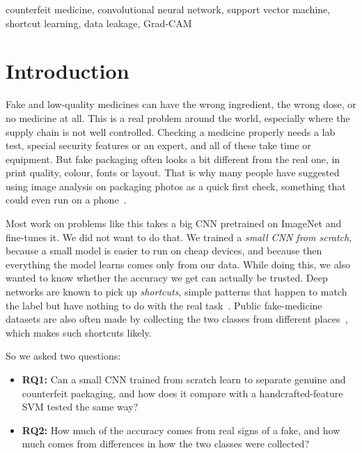 \documentclass[conference]{IEEEtran}
\begin{document}
\begin{IEEEkeywords}
counterfeit medicine, convolutional neural network, support vector machine, shortcut learning, data leakage, Grad-CAM
\end{IEEEkeywords}

\section{Introduction}
Fake and low-quality medicines can have the wrong ingredient, the wrong dose, or no medicine at all. This is a real problem around the world, especially where the supply chain is not well controlled. Checking a medicine properly needs a lab test, special security features or an expert, and all of these take time or equipment. But fake packaging often looks a bit different from the real one, in print quality, colour, fonts or layout. That is why many people have suggested using image analysis on packaging photos as a quick first check, something that could even run on a phone~\cite{ramos2024,zakaria2025}.

Most work on problems like this takes a big CNN pretrained on ImageNet and fine-tunes it. We did not want to do that. We trained a \emph{small CNN from scratch}, because a small model is easier to run on cheap devices, and because then everything the model learns comes only from our data. While doing this, we also wanted to know whether the accuracy we get can actually be trusted. Deep networks are known to pick up \emph{shortcuts}, simple patterns that happen to match the label but have nothing to do with the real task~\cite{geirhos2020,zech2018}. Public fake-medicine datasets are also often made by collecting the two classes from different places~\cite{provenance2026}, which makes such shortcuts likely.

So we asked two questions:
\begin{itemize}
\item \textbf{RQ1:} Can a small CNN trained from scratch learn to separate genuine and counterfeit packaging, and how does it compare with a handcrafted-feature SVM tested the same way?
\item \textbf{RQ2:} How much of the accuracy comes from real signs of a fake, and how much comes from differences in how the two classes were collected?
\end{itemize}
\end{document}
